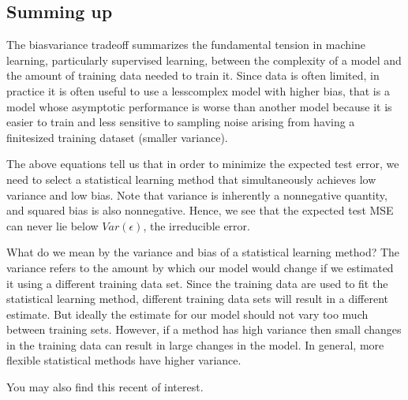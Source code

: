 \documentclass[letterpaper,10pt,english]{sphinxmanual}
\begin{document}
\subsection{Summing up}
\label{\detokenize{chapter4:summing-up}}
The bias\sphinxhyphen{}variance tradeoff summarizes the fundamental tension in
machine learning, particularly supervised learning, between the
complexity of a model and the amount of training data needed to train
it.  Since data is often limited, in practice it is often useful to
use a less\sphinxhyphen{}complex model with higher bias, that is  a model whose asymptotic
performance is worse than another model because it is easier to
train and less sensitive to sampling noise arising from having a
finite\sphinxhyphen{}sized training dataset (smaller variance).

The above equations tell us that in
order to minimize the expected test error, we need to select a
statistical learning method that simultaneously achieves low variance
and low bias. Note that variance is inherently a nonnegative quantity,
and squared bias is also nonnegative. Hence, we see that the expected
test MSE can never lie below \(Var(\epsilon)\), the irreducible error.

What do we mean by the variance and bias of a statistical learning
method? The variance refers to the amount by which our model would change if we
estimated it using a different training data set. Since the training
data are used to fit the statistical learning method, different
training data sets  will result in a different estimate. But ideally the
estimate for our model should not vary too much between training
sets. However, if a method has high variance  then small changes in
the training data can result in large changes in the model. In general, more
flexible statistical methods have higher variance.

You may also find this recent  of interest.
\end{document}

